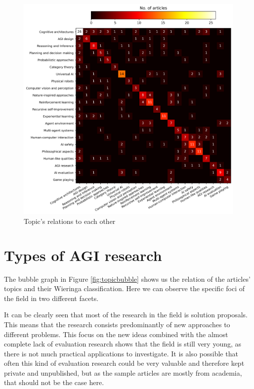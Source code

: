 \documentclass[utf8,english]{gradu3}
\begin{document}
\begin{figure}[H]
  \centering
  \includegraphics[scale=0.65]{material/data/topic_heatmap_no_zeroes.png}
  \caption{Topic's relations to each other}
  \label{fig:topicheat}
\end{figure}


\section{Types of AGI research}

The bubble graph in Figure \ref{fig:topicbubble} shows us the relation of the
articles' topics and their Wieringa classification. Here we can observe the
specific foci of the field in two different facets.

It can be clearly seen that most of the research in the field is solution
proposals. This means that the research consists predominantly of new approaches
to different problems. This focus on the new ideas combined with the almost
complete lack of evaluation research shows that the field is still very young,
as there is not much practical applications to investigate. It is also possible
that often this kind of evaluation research could be very valuable and therefore
kept private and unpublished, but as the sample articles are mostly from
academia, that should not be the case here. 
\end{document}

